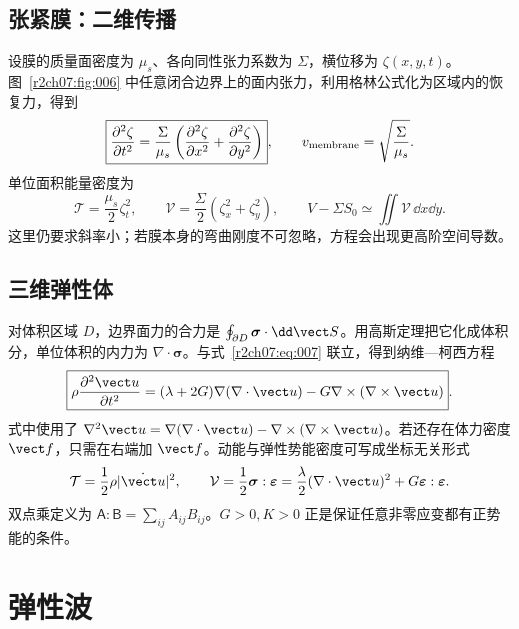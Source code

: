 \subsection{张紧膜：二维传播}
\label{r2ch07:subsec:membrane}

设膜的质量面密度为 $\mu_s$、各向同性张力系数为 $\Sigma$，横位移为 $\zeta(x,y,t)$。图~\ref{r2ch07:fig:006} 中任意闭合边界上的面内张力，利用格林公式化为区域内的恢复力，得到
\begin{equation}
 \boxed{\frac{\partial^2\zeta}{\partial t^2}
 =\frac\Sigma{\mu_s}\left(\frac{\partial^2\zeta}{\partial x^2}
 +\frac{\partial^2\zeta}{\partial y^2}\right)},\qquad
 v_{\rm membrane}=\sqrt{\frac\Sigma{\mu_s}}.
 \label{r2ch07:eq:015}
\end{equation}
单位面积能量密度为
\begin{equation}
 \mathcal T=\frac{\mu_s}{2}\zeta_t^2,\qquad
 \mathcal V=\frac\Sigma2(\zeta_x^2+\zeta_y^2),\qquad
 V-\Sigma S_0\simeq\iint\mathcal V\,\dd x\dd y.
 \label{r2ch07:eq:016}
\end{equation}
这里仍要求斜率小；若膜本身的弯曲刚度不可忽略，方程会出现更高阶空间导数。
\figMembraneModel

\subsection{三维弹性体}
\label{r2ch07:subsec:body}

对体积区域 $D$，边界面力的合力是 $\oint_{\partial D}\boldsymbol\sigma\cdot\dd\vect S$。用高斯定理把它化成体积分，单位体积的内力为 $\nabla\cdot\boldsymbol\sigma$。与式~\eqref{r2ch07:eq:007} 联立，得到纳维—柯西方程
\begin{equation}
 \boxed{\rho\frac{\partial^2\vect u}{\partial t^2}
 =(\lambda+2G)\nabla(\nabla\cdot\vect u)
 -G\nabla\times(\nabla\times\vect u)}.
 \label{r2ch07:eq:017}
\end{equation}
式中使用了 $\nabla^2\vect u=\nabla(\nabla\cdot\vect u)-\nabla\times(\nabla\times\vect u)$。若还存在体力密度 $\vect f$，只需在右端加 $\vect f$。动能与弹性势能密度可写成坐标无关形式
\begin{equation}
 \mathcal T=\frac12\rho|\dot{\vect u}|^2,\qquad
 \mathcal V=\frac12\boldsymbol\sigma:\boldsymbol\varepsilon
 =\frac\lambda2(\nabla\cdot\vect u)^2+G\boldsymbol\varepsilon:\boldsymbol\varepsilon.
 \label{r2ch07:eq:018}
\end{equation}
双点乘定义为 $\mathsf A:\mathsf B=\sum_{ij}A_{ij}B_{ij}$。$G>0,K>0$ 正是保证任意非零应变都有正势能的条件。

\section{弹性波}
\label{r2ch07:sec:waves}

